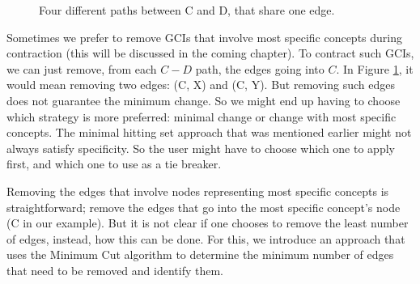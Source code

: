 \begin{figure}
\centering
{}
\caption{Four different paths between C and D, that share one edge.}
\label{ex1}
\end{figure}

Sometimes we prefer to remove GCIs that involve most specific concepts during contraction (this will be discussed in the coming chapter). To contract such GCIs, we can just remove, from each $C-D$ path, the edges going into $C$. In Figure \ref{ex1}, it would mean removing two edges: (C, X) and (C, Y). But removing such edges does not guarantee the minimum change. So we might end up having to choose which strategy is more preferred: minimal change or change with most specific concepts. The minimal hitting set approach that was mentioned earlier might not always satisfy specificity. So the user might have to choose which one to apply first, and which one to use as a tie breaker.

Removing the edges that involve nodes representing most specific concepts is straightforward; remove the edges that go into the most specific concept's node (C in our example). But it is not clear if one chooses to remove the least number of edges, instead, how this can be done. For this, we introduce an approach that uses the Minimum Cut algorithm to determine the minimum number of edges that need to be removed and identify them.

